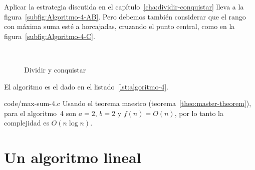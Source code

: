   Aplicar la estrategia discutida en el capítulo~\ref{cha:dividir-conquistar}
  lleva a la figura~\ref{subfig:Algoritmo-4-AB}.
  Pero debemos también considerar que el rango con máxima suma
  esté a horcajadas,
  cruzando el punto central,
  como en la figura~\ref{subfig:Algoritmo-4-C}.
  \begin{figure}[ht]
    \centering
     \\
    \caption{Dividir y conquistar}
    \label{fig:algoritmo-4}
  \end{figure}
  El algoritmo es el dado en el listado~\ref{lst:algoritmo-4}.
  
                  {code/max-sum-4.c}
  Usando el teorema maestro
  (teorema~\ref{theo:master-theorem}),
  para el algoritmo~4 son \(a = 2\), \(b = 2\) y  \(f(n) = O(n)\),
  por lo tanto la complejidad es \(O(n \log n)\).

\section{Un algoritmo lineal}
\label{sec:algoritmo-5}

